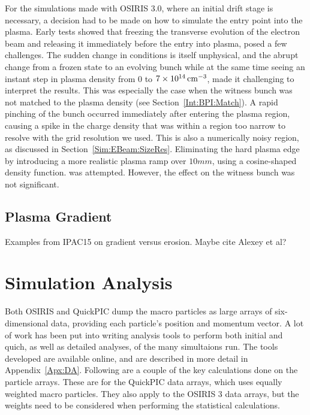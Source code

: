 For the simulations made with OSIRIS 3.0, where an initial drift stage is necessary, a decision had to be made on how to simulate the entry point into the plasma.
Early tests showed that freezing the transverse evolution of the electron beam and releasing it immediately before the entry into plasma, posed a few challenges.
The sudden change in conditions is itself unphysical, and the abrupt change from a frozen state to an evolving bunch while at the same time seeing an instant step in plasma density from $0$ to $7\times 10^{14}\,\mathrm{cm}^{-3}$, made it challenging to interpret the results.
This was especially the case when the witness bunch was not matched to the plasma density (see Section~\ref{Int:BPI:Match}).
A rapid pinching of the bunch occurred immediately after entering the plasma region, causing a spike in the charge density that was within a region too narrow to resolve with the grid resolution we used.
This is also a numerically noisy region, as discussed in Section~\ref{Sim:EBeam:SizeRes}.
Eliminating the hard plasma edge by introducing a more realistic plasma ramp over $10\unit{mm}$, using a cosine-shaped density function. was attempted.
However, the effect on the witness bunch was not significant.

\subsection{Plasma Gradient}
\label{Sim:Plasma:Grad}

Examples from IPAC15 on gradient versus erosion. Maybe cite Alexey et al?

\section{Simulation Analysis}
\label{Sim:Analysis}

Both OSIRIS and QuickPIC dump the macro particles as large arrays of six-dimensional data, providing each particle's position and momentum vector.
A lot of work has been put into writing analysis tools to perform both initial and quich, as well as detailed analyses, of the many simultaions run.
The tools developed are available online, and are described in more detail in Appendix~\ref{Apx:DA}.
Following are a couple of the key calculations done on the particle arrays.
These are for the QuickPIC data arrays, which uses equally weighted macro particles.
They also apply to the OSIRIS 3 data arrays, but the weights need to be considered when performing the statistical calculations.

